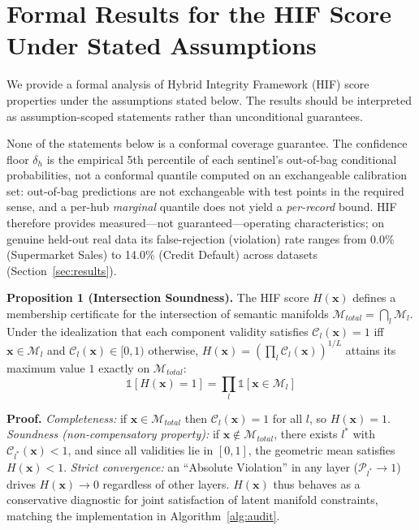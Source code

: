 \section{Formal Results for the HIF Score Under Stated Assumptions}\label{app:formal_results}

We provide a formal analysis of Hybrid Integrity Framework (HIF) score properties under the assumptions stated below. The results should be interpreted as assumption-scoped statements rather than unconditional guarantees.

None of the statements below is a conformal coverage guarantee. The confidence floor $\delta_h$ is the empirical 5th percentile of each sentinel's out-of-bag conditional probabilities, not a conformal quantile computed on an exchangeable calibration set: out-of-bag predictions are not exchangeable with test points in the required sense, and a per-hub \emph{marginal} quantile does not yield a \emph{per-record} bound. HIF therefore provides measured---not guaranteed---operating characteristics; on genuine held-out real data its false-rejection (violation) rate ranges from 0.0\% (Supermarket Sales) to 14.0\% (Credit Default) across datasets (Section~\ref{sec:results}).

\textbf{Proposition 1 (Intersection Soundness).} The HIF score $H(\mathbf{x})$ defines a membership certificate for the intersection of semantic manifolds $\mathcal{M}_{total} = \bigcap_{l} \mathcal{M}_l$. Under the idealization that each component validity satisfies $\mathcal{C}_l(\mathbf{x}) = 1$ iff $\mathbf{x} \in \mathcal{M}_l$ and $\mathcal{C}_l(\mathbf{x}) \in [0, 1)$ otherwise, $H(\mathbf{x}) = \left( \prod_l \mathcal{C}_l(\mathbf{x}) \right)^{1/L}$ attains its maximum value $1$ exactly on $\mathcal{M}_{total}$:
\begin{equation}
    \mathbb{1}[H(\mathbf{x}) = 1] = \prod_{l} \mathbb{1}[\mathbf{x} \in \mathcal{M}_l]
\end{equation}

\textbf{Proof.} \emph{Completeness:} if $\mathbf{x} \in \mathcal{M}_{total}$ then $\mathcal{C}_l(\mathbf{x}) = 1$ for all $l$, so $H(\mathbf{x}) = 1$. \emph{Soundness (non-compensatory property):} if $\mathbf{x} \notin \mathcal{M}_{total}$, there exists $l^*$ with $\mathcal{C}_{l^*}(\mathbf{x}) < 1$, and since all validities lie in $[0,1]$, the geometric mean satisfies $H(\mathbf{x}) < 1$. \emph{Strict convergence:} an ``Absolute Violation'' in any layer ($\mathcal{P}_{l^*} \to 1$) drives $H(\mathbf{x}) \to 0$ regardless of other layers. $H(\mathbf{x})$ thus behaves as a conservative diagnostic for joint satisfaction of latent manifold constraints, matching the implementation in Algorithm~\ref{alg:audit}.

